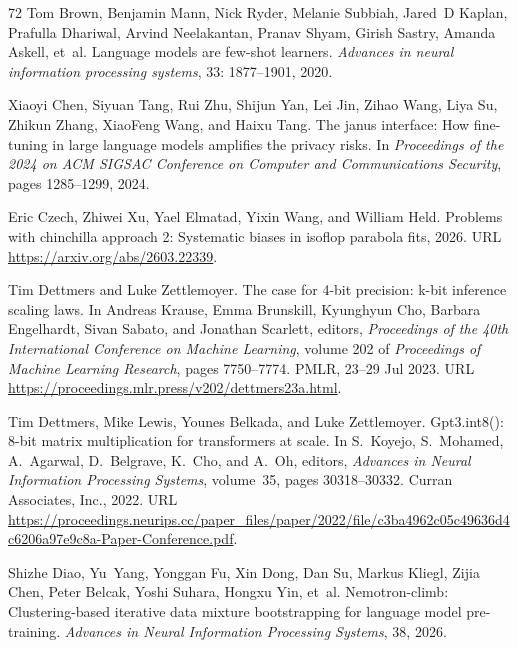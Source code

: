 \begin{thebibliography}{72}
Tom Brown, Benjamin Mann, Nick Ryder, Melanie Subbiah, Jared~D Kaplan, Prafulla Dhariwal, Arvind Neelakantan, Pranav Shyam, Girish Sastry, Amanda Askell, et~al.
\newblock Language models are few-shot learners.
\newblock \emph{Advances in neural information processing systems}, 33: 1877--1901, 2020.

Xiaoyi Chen, Siyuan Tang, Rui Zhu, Shijun Yan, Lei Jin, Zihao Wang, Liya Su, Zhikun Zhang, XiaoFeng Wang, and Haixu Tang.
\newblock The janus interface: How fine-tuning in large language models amplifies the privacy risks.
\newblock In \emph{Proceedings of the 2024 on ACM SIGSAC Conference on Computer and Communications Security}, pages 1285--1299, 2024.

Eric Czech, Zhiwei Xu, Yael Elmatad, Yixin Wang, and William Held.
\newblock Problems with chinchilla approach 2: Systematic biases in isoflop parabola fits, 2026.
\newblock URL \url{https://arxiv.org/abs/2603.22339}.

Tim Dettmers and Luke Zettlemoyer.
\newblock The case for 4-bit precision: k-bit inference scaling laws.
\newblock In Andreas Krause, Emma Brunskill, Kyunghyun Cho, Barbara Engelhardt, Sivan Sabato, and Jonathan Scarlett, editors, \emph{Proceedings of the 40th International Conference on Machine Learning}, volume 202 of \emph{Proceedings of Machine Learning Research}, pages 7750--7774. PMLR, 23--29 Jul 2023.
\newblock URL \url{https://proceedings.mlr.press/v202/dettmers23a.html}.

Tim Dettmers, Mike Lewis, Younes Belkada, and Luke Zettlemoyer.
\newblock Gpt3.int8(): 8-bit matrix multiplication for transformers at scale.
\newblock In S.~Koyejo, S.~Mohamed, A.~Agarwal, D.~Belgrave, K.~Cho, and A.~Oh, editors, \emph{Advances in Neural Information Processing Systems}, volume~35, pages 30318--30332. Curran Associates, Inc., 2022.
\newblock URL \url{https://proceedings.neurips.cc/paper_files/paper/2022/file/c3ba4962c05c49636d4c6206a97e9c8a-Paper-Conference.pdf}.

Shizhe Diao, Yu~Yang, Yonggan Fu, Xin Dong, Dan Su, Markus Kliegl, Zijia Chen, Peter Belcak, Yoshi Suhara, Hongxu Yin, et~al.
\newblock Nemotron-climb: Clustering-based iterative data mixture bootstrapping for language model pre-training.
\newblock \emph{Advances in Neural Information Processing Systems}, 38, 2026.


\end{thebibliography}
